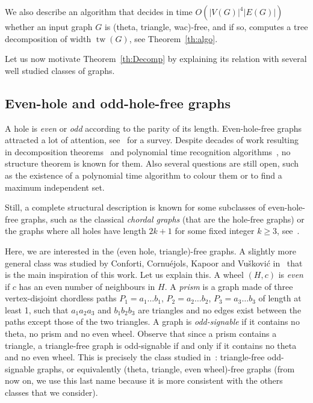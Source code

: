 \documentclass[11pt]{article}
\DeclareMathOperator{\tw}{tw}
\begin{document}
We also describe an algorithm that decides in time $O(|V(G)|^4|E(G)|)$ whether an input graph $G$ is (theta, triangle, wac)-free, and if so, computes a tree decomposition of width $\tw(G)$, see Theorem~\ref{th:algo}. 

Let us now motivate Theorem~\ref{th:Decomp} by explaining its relation with several well studied classes of graphs. 


\subsection*{Even-hole and odd-hole-free graphs}

A hole is \emph{even} or \emph{odd} according to the parity of its length. Even-hole-free graphs attracted a lot of attention, see~\cite{vuskovic:evensurvey} for a survey. 
Despite decades of work resulting in decomposition theorems~\cite{conforti.c.k.v:eh1,dsv:ehf} and polynomial time recognition algorithms~\cite{conforti.c.k.v:eh2,DBLP:conf/stoc/LaiLT20}, no structure theorem is known for them.  
Also several questions are still open, such as the existence of a polynomial time algorithm to colour them or to find a maximum independent set. 

Still, a complete structural description is known for some subclasses of even-hole-free graphs, such as the classical \emph{chordal graphs} (that are the hole-free graphs) or the graphs where all holes have length $2k+1$ for some fixed integer $k\geq 3$, see~\cite{DBLP:journals/jctb/CookHPRSSTV24}.

Here, we are interested in the (even hole, triangle)-free graphs.  A slightly more general class was studied by Conforti, Cornu\'ejols, Kapoor and Vu\v skovi\'c in~\cite{DBLP:journals/jgt/ConfortiCKV00} that is the main inspiration of this work. 
Let us explain this. 
A wheel $(H, c)$ is \emph{even} if $c$ has an even number of neighbours in $H$. A {\em prism} is a graph made of three vertex-disjoint chordless paths
$P_1 = a_1 \dots b_1$, $P_2 = a_2 \dots b_2$, $P_3 = a_3 \dots b_3$ of length at least 1, such that $a_1a_2a_3$ and $b_1b_2b_3$ are triangles and no edges exist between the paths except those of the two
triangles.  
A  graph is \emph{odd-signable} if it contains no theta, no prism and no even wheel.  Observe that since a prism contains a triangle, a triangle-free graph is odd-signable if and only if it contains no theta and no even wheel. 
This is precisely the class studied in~\cite{DBLP:journals/jgt/ConfortiCKV00}: triangle-free odd-signable graphs, or equivalently (theta, triangle, even wheel)-free graphs (from now on, we use this last name because it is more consistent with the others classes that we consider).
\end{document}
